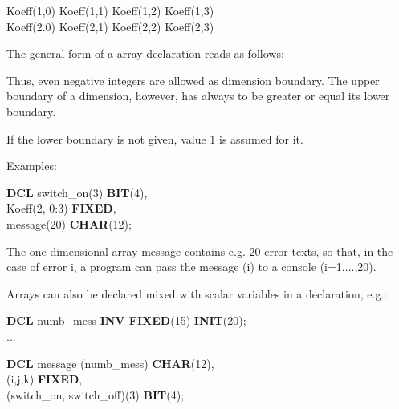 Koeff(1,0) \x  Koeff(1,1) \x  Koeff(1,2) \x  Koeff(1,3) \\
Koeff(2.0) \x  Koeff(2,1) \x  Koeff(2,2) \x  Koeff(2,3)

The general form of a array declaration reads as follows:

 





Thus, even negative integers are allowed as dimension boundary. The
upper boundary of a dimension, however, has always to be greater or
equal its lower boundary.

If the lower boundary is not given, value 1 is assumed for it.


Examples:

{\bf DCL} switch\_on(3) {\bf BIT}(4),\\
\x Koeff(2, 0:3) {\bf FIXED},\\
\x message(20) {\bf CHAR}(12);

The one-dimensional array message contains e.g. 20 error texts, so that,
in the case of error i, a program can pass the message (i) to a console
(i=1,...,20).

Arrays can also be declared mixed with scalar variables in a declaration,
e.g.:

{\bf DCL} numb\_mess {\bf INV FIXED}(15) {\bf INIT}(20);\\
\x ...

{\bf DCL}  message (numb\_mess) {\bf CHAR}(12),\\
\x (i,j,k) {\bf FIXED},\\
\x (switch\_on, switch\_off)(3) {\bf BIT}(4);

